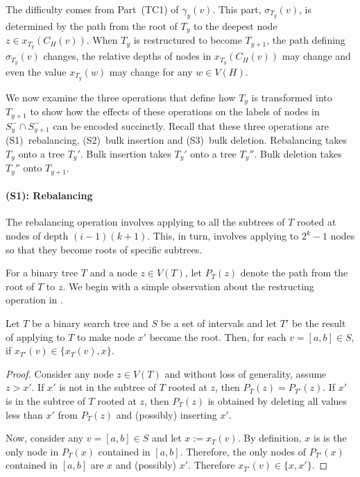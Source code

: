 \documentclass[kpfonts]{patmorin}
\begin{document}
The difficulty comes from Part~(TC1) of $\gamma_y(v)$.  This part, $\sigma_{T_y}(v)$, is determined by the path from the root of $T_y$ to the deepest node $z\in x_{T_y}(C_H(v))$.  When $T_y$ is restructured to become $T_{y+1}$, the path defining $\sigma_{T_y}(v)$ changes, the relative depths of nodes in $x_{T_y}(C_H(v))$ may change and even the value $x_{T_y}(w)$ may change for any $w\in V(H)$.  

We now examine the three operations that define how $T_y$ is transformed into $T_{y+1}$ to show how the effects of these operations on the labels of nodes in $S^-_y\cap S^-_{y+1}$ can be encoded succinctly.  Recall that these three operations are (S1)~rebalancing, (S2)~bulk insertion and (S3)~bulk deletion.  
Rebalancing takes $T_y$ onto a tree $T_y'$. Bulk insertion takes $T_y'$ onto a tree $T_y''$.  Bulk deletion takes $T_y''$ onto $T_{y+1}$.


\paragraph{(S1): Rebalancing}

The rebalancing operation involves applying  to all the subtrees of $T$ rooted at nodes of depth $(i-1)(k+1)$.  This, in turn, involves applying  to $2^k-1$ nodes so that they become roots of specific subtrees.

For a binary tree $T$ and a node $z\in V(T)$, let $P_T(z)$ denote the path from the root of $T$ to $z$.  We begin with a simple observation about the restructing operation in .

\begin{obs}
  Let $T$ be a binary search tree and $S$ be a set of intervals and let $T'$ be the result of applying  to $T$ to make node $x'$ become the root.  Then, for each $v=[a,b]\in S$, if $x_{T'}(v)\in\{x_T(v), x\}$.
\end{obs}

\begin{proof}
  Consider any node $z\in V(T)$ and without loss of generality, assume $z>x'$. 
  If $x'$ is not in the subtree of $T$ rooted at $z$, then $P_T(z)=P_{T'}(z)$.  If $x'$ is in the subtree of $T$ rooted at $z$, then $P_T(z)$ is obtained by deleting all values less than $x'$ from $P_T(z)$ and (possibly) inserting $x'$.
  
  Now, consider any $v=[a,b]\in S$ and let $x:=x_T(v)$. By definition, $x$ is is the only node in $P_T(x)$ contained in $[a,b]$. Therefore, the only nodes of $P_{T'}(x)$ contained in $[a,b]$ are $x$ and (possibly) $x'$.  Therefore $x_{T'}(v)\in \{x,x'\}$.
\end{proof}
\end{document}
